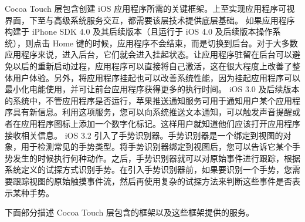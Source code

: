Cocoa Touch 层包含创建 iOS 应用程序所需的关键框架。上至实现应用程序可视界面，下至与高级系统服务交互，都需要该层技术提供底层基础。
如果应用程序构建于 iPhone SDK 4.0 及其后续版本（且运行于 iOS 4.0 及后续版本操作系统），则点击 Home 键的时候，应用程序不会结束，而是切换到后台。对于大多数应用程序来说，进入后台，它们就会进入挂起状态。让应用程序驻留在后台可以避免以后的重新启动过程，应用程序可以直接将自己激活，这在很大程度上改善了整体用户体验。另外，将应用程序挂起也可以改善系统性能，因为挂起应用程序可以最小化电能使用，并可让前台应用程序获得更多的执行时间。
iOS 3.0 及后续版本的系统中，不管应用程序是否运行，苹果推送通知服务可用于通知用户某个应用程序具有新信息。利用这项服务，您可以向系统推送文本通知，可以触发声音提醒或者在应用程序图标上添加一个数字化标记。这样用户就知道他们应该打开应用程序接收相关信息。
iOS 3.2 引入了手势识别器。手势识别器是一个绑定到视图的对象，用于检测常见的手势类型。将手势识别器绑定到视图后，您可以告诉它某个手势发生的时候执行何种动作。之后，手势识别器就可以对原始事件进行跟踪，根据系统定义的试探方式识别手势。在引入手势识别器前，如果要识别一个手势，您需要跟踪视图的原始触摸事件流，然后再使用复杂的试探方法来判断这些事件是否表示某种手势。

下面部分描述 Cocoa Touch 层包含的框架以及这些框架提供的服务。

